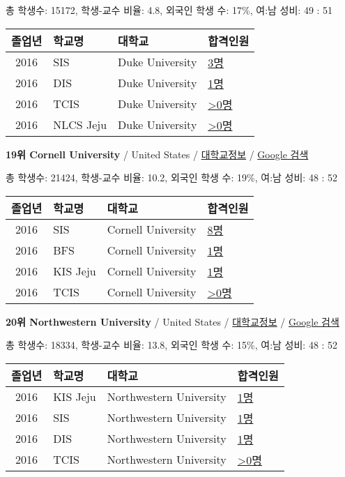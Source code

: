 \documentclass[13pt,]{article}
\begin{document}
총 학생수: 15172, 학생-교수 비율: 4.8, 외국인 학생 수: 17\%, 여:남 성비:
49 : 51

\begin{longtable}[]{@{}clll@{}}
\toprule
졸업년 & 학교명 & 대학교 & 합격인원\tabularnewline
\midrule
\endhead
2016 & SIS & Duke University &
\href{http://cafe.naver.com/assarabia/11589}{3명}\tabularnewline
2016 & DIS & Duke University &
\href{http://cafe.naver.com/assarabia/11591}{1명}\tabularnewline
2016 & TCIS & Duke University &
\href{http://cafe.naver.com/assarabia/11598}{\textgreater{}0명}\tabularnewline
2016 & NLCS Jeju & Duke University &
\href{http://cafe.naver.com/assarabia/11592}{\textgreater{}0명}\tabularnewline
\bottomrule
\end{longtable}

\textbf{19위 Cornell University} / United States /
\href{https://www.timeshighereducation.com/world-university-rankings/cornell-university?ranking-dataset=589595}{대학교정보}
/ \href{http://www.google.com/search?q=Cornell+University}{Google 검색}

총 학생수: 21424, 학생-교수 비율: 10.2, 외국인 학생 수: 19\%, 여:남
성비: 48 : 52

\begin{longtable}[]{@{}clll@{}}
\toprule
졸업년 & 학교명 & 대학교 & 합격인원\tabularnewline
\midrule
\endhead
2016 & SIS & Cornell University &
\href{http://cafe.naver.com/assarabia/11589}{8명}\tabularnewline
2016 & BFS & Cornell University &
\href{http://cafe.naver.com/assarabia/11597}{1명}\tabularnewline
2016 & KIS Jeju & Cornell University &
\href{http://cafe.naver.com/assarabia/11596}{1명}\tabularnewline
2016 & TCIS & Cornell University &
\href{http://cafe.naver.com/assarabia/11598}{\textgreater{}0명}\tabularnewline
\bottomrule
\end{longtable}

\textbf{20위 Northwestern University} / United States /
\href{https://www.timeshighereducation.com/world-university-rankings/northwestern-university?ranking-dataset=589595}{대학교정보}
/ \href{http://www.google.com/search?q=Northwestern+University}{Google
검색}

총 학생수: 18334, 학생-교수 비율: 13.8, 외국인 학생 수: 15\%, 여:남
성비: 48 : 52

\begin{longtable}[]{@{}clll@{}}
\toprule
졸업년 & 학교명 & 대학교 & 합격인원\tabularnewline
\midrule
\endhead
2016 & KIS Jeju & Northwestern University &
\href{http://cafe.naver.com/assarabia/11596}{1명}\tabularnewline
2016 & SIS & Northwestern University &
\href{http://cafe.naver.com/assarabia/11589}{1명}\tabularnewline
2016 & DIS & Northwestern University &
\href{http://cafe.naver.com/assarabia/11591}{1명}\tabularnewline
2016 & TCIS & Northwestern University &
\href{http://cafe.naver.com/assarabia/11598}{\textgreater{}0명}\tabularnewline
\bottomrule
\end{longtable}
\end{document}
